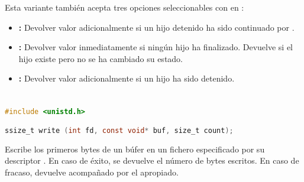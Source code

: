 Esta variante también acepta tres opciones seleccionables con  en :

\begin{itemize}
	\item{}\textbf{:} Devolver valor adicionalmente si un hijo detenido ha sido continuado por .
	\item{}\textbf{:} Devolver valor inmediatamente si ningún hijo ha finalizado. Devuelve  si el hijo  existe pero no se ha cambiado su estado.
	\item{}\textbf{:} Devolver valor adicionalmente si un hijo ha sido detenido.
\end{itemize}

\section{}\label{write}

\begin{lstlisting}[language=C]
#include <unistd.h>

ssize_t write (int fd, const void* buf, size_t count);
\end{lstlisting}

Escribe los  primeros bytes de un búfer  en un fichero especificado por su descriptor .
En caso de éxito, se devuelve el número de bytes escritos.
En caso de fracaso, devuelve  acompañado por el  apropiado.
